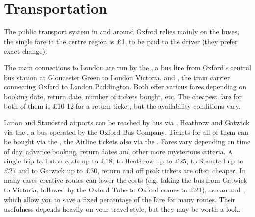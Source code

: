 \section{Transportation}

The public transport system in and around Oxford relies mainly on the
\href{http://www.oxfordbus.co.uk/}{} buses, the
single fare in the centre region is \pounds1, to be paid to the driver (they
prefer exact change).

The main connections to London are run by the
\href{http://www.oxfordtube.com/}{}, a bus line from
Oxford's central bus station at Gloucester Green to London Victoria, and
\href{https://www.firstgreatwestern.co.uk/}{},
the train carrier connecting Oxford to London Paddington. Both offer various fares depending on booking date,
return date, number of tickets bought, etc. The cheapest fare for both of them
is \pounds10-12 for a return ticket, but the availability conditions
vary.

Luton and Standsted airports can be reached by bus via
\href{http://www.nationalexpress.com/}{}, Heathrow
and Gatwick via the \href{http://airline.oxfordbus.co.uk/}{},
a bus operated by the Oxford Bus Company.
Tickets for all of them can be bought via the
\href{http://www.nationalexpress.com/}{}, the
Airline tickets also via the \href{https://airlinebooking.oxfordbus.co.uk/}{}.
Fares vary depending on time of day, advance booking, return dates and other
more mysterious criteria. A single trip to Luton costs up to \pounds18, to
Heathrow up to \pounds25, to Stansted up to \pounds27 and to Gatwick up to \pounds30,
return and off peak tickets are often cheaper.
In many cases creative routes can lower the costs (e.g. taking the bus from
Gatwick to Victoria, followed by the Oxford Tube to Oxford comes to \pounds21),
as can
\href{http://www.nationalexpress.com/waystosave/young-persons-coachcard.aspx}
{}
and \href{http://www.railcard.co.uk/}{}, which allow you to
save a fixed percentage of the fare for many routes. Their usefulness depends heavily on your travel style, but they may be worth a look.
